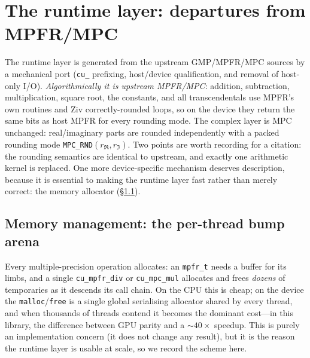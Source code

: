 \documentclass[11pt,a4paper]{article}
\newcommand{\code}[1]{\texttt{#1}}
\begin{document}
\section{The runtime layer: departures from MPFR/MPC}
\label{sec:runtime}

The runtime layer is generated from the upstream GMP/MPFR/MPC sources by a
mechanical port (\code{cu\_} prefixing, host/device qualification, and removal of
host-only I/O). \emph{Algorithmically it is upstream MPFR/MPC}: addition,
subtraction, multiplication, square root, the constants, and all transcendentals
use MPFR's own routines and Ziv correctly-rounded loops, so on the device they
return the same bits as host MPFR for every rounding mode. The complex layer is
MPC unchanged: real/imaginary parts are rounded independently with a packed
rounding mode \code{MPC\_RND}$(r_\Re,r_\Im)$. Two points are worth recording for a
citation: the rounding semantics are identical to upstream, and exactly one
arithmetic kernel is replaced. One more device-specific mechanism deserves
description, because it is essential to making the runtime layer fast rather than
merely correct: the memory allocator (\S\ref{sec:arena}).

\subsection{Memory management: the per-thread bump arena}
\label{sec:arena}

Every multiple-precision operation allocates: an \code{mpfr\_t} needs a buffer for
its limbs, and a single \code{cu\_mpfr\_div} or \code{cu\_mpc\_mul} allocates and
frees \emph{dozens} of temporaries as it descends its call chain. On the CPU this
is cheap; on the device the \code{malloc}/\code{free} is a single global
serialising allocator shared by every thread, and when thousands of threads
contend it becomes the dominant cost---in this library, the difference between
GPU parity and a $\sim\!40\times$ speedup. This is purely an implementation
concern (it does not change any result), but it is the reason the runtime layer is
usable at scale, so we record the scheme here.
\end{document}
